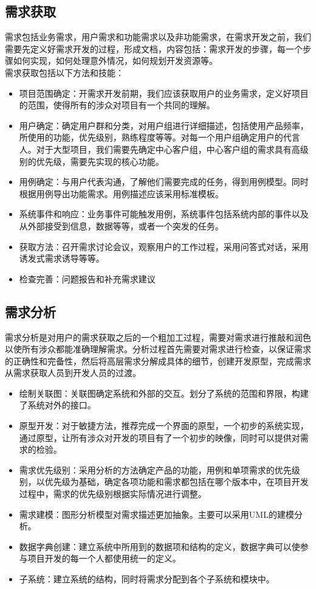 \documentclass[UTF8,nofonts]{ctexart}
\begin{document}
\subsection{\textbf{需求获取}}
	需求包括业务需求，用户需求和功能需求以及非功能需求，在需求开发之前，我们需要先定义好需求开发的过程，形成文档，内容包括：需求开发的步骤，每一个步骤如何实现，如何处理意外情况，如何规划开发资源等。\\
需求获取包括以下方法和技能：
\begin{itemize}
 \setlength{\itemsep}{0pt}
 \setlength{\parskip}{0pt}
 \setlength{\parsep}{0pt}
\item 项目范围确定：开需求开发前期，我们应该获取用户的业务需求，定义好项目的范围，使得所有的涉众对项目有一个共同的理解。
\item 用户确定：确定用户群和分类，对用户组进行详细描述，包括使用产品频率，所使用的功能，优先级别，熟练程度等等。对每一个用户组确定用户的代言人。对于大型项目，我们需要先确定中心客户组，中心客户组的需求具有高级别的优先级，需要先实现的核心功能。
\item 用例确定：与用户代表沟通，了解他们需要完成的任务，得到用例模型。同时根据用例导出功能需求。用例描述应该采用标准模板。
\item 系统事件和响应：业务事件可能触发用例，系统事件包括系统内部的事件以及从外部接受到信息，数据等等，或者一个突发的任务。\\
\item 获取方法：召开需求讨论会议，观察用户的工作过程，采用问答式对话，采用诱发式需求诱导等等。
\item 检查完善：问题报告和补充需求建议
\end{itemize}
\subsection{\textbf{需求分析}}
需求分析是对用户的需求获取之后的一个粗加工过程，需要对需求进行推敲和润色以使所有涉众都能准确理解需求。分析过程首先需要对需求进行检查，以保证需求的正确性和完备性，然后将高层需求分解成具体的细节，创建开发原型，完成需求从需求获取人员到开发人员的过渡。
\begin{itemize}
 \setlength{\itemsep}{0pt}
 \setlength{\parskip}{0pt}
 \setlength{\parsep}{0pt}
\item 绘制关联图：关联图确定系统和外部的交互。划分了系统的范围和界限，构建了系统对外的接口。
\item	原型开发：对于敏捷方法，推荐完成一个界面的原型，一个初步的系统实现，通过原型，让所有涉众对开发的项目有了一个初步的映像，同时可以提供对需求的检验。
\item	需求优先级别：采用分析的方法确定产品的功能，用例和单项需求的优先级别，以优先级为基础，确定各项功能和需求都包括在哪个版本中，在项目开发过程中，需求的优先级别根据实际情况进行调整。
\item	需求建模：图形分析模型对需求描述更加抽象。主要可以采用UML的建模分析。
\item	数据字典创建：建立系统中所用到的数据项和结构的定义，数据字典可以使参与项目开发的每一个人都使用统一的定义。
\item	子系统：建立系统的结构，同时将需求分配到各个子系统和模块中。
\end{itemize}
\end{document}
